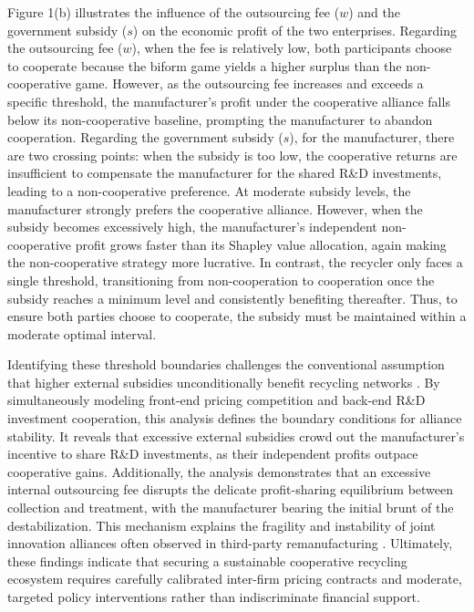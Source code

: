 \documentclass[authoryear,preprint,review,times,10pt]{elsarticle}
\begin{document}
Figure 1(b) illustrates the influence of the outsourcing fee ($w$) and the government subsidy ($s$) on the economic profit of the two enterprises. Regarding the outsourcing fee ($w$), when the fee is relatively low, both participants choose to cooperate because the biform game yields a higher surplus than the non-cooperative game. However, as the outsourcing fee increases and exceeds a specific threshold, the manufacturer's profit under the cooperative alliance falls below its non-cooperative baseline, prompting the manufacturer to abandon cooperation. Regarding the government subsidy ($s$), for the manufacturer, there are two crossing points: when the subsidy is too low, the cooperative returns are insufficient to compensate the manufacturer for the shared R\&D investments, leading to a non-cooperative preference. At moderate subsidy levels, the manufacturer strongly prefers the cooperative alliance. However, when the subsidy becomes excessively high, the manufacturer's independent non-cooperative profit grows faster than its Shapley value allocation, again making the non-cooperative strategy more lucrative. In contrast, the recycler only faces a single threshold, transitioning from non-cooperation to cooperation once the subsidy reaches a minimum level and consistently benefiting thereafter. Thus, to ensure both parties choose to cooperate, the subsidy must be maintained within a moderate optimal interval.

Identifying these threshold boundaries challenges the conventional assumption that higher external subsidies unconditionally benefit recycling networks \citep{yuan2023Differentiated}. By simultaneously modeling front-end pricing competition and back-end R\&D investment cooperation, this analysis defines the boundary conditions for alliance stability. It reveals that excessive external subsidies crowd out the manufacturer's incentive to share R\&D investments, as their independent profits outpace cooperative gains. Additionally, the analysis demonstrates that an excessive internal outsourcing fee disrupts the delicate profit-sharing equilibrium between collection and treatment, with the manufacturer bearing the initial brunt of the destabilization. This mechanism explains the fragility and instability of joint innovation alliances often observed in third-party remanufacturing \citep{chen2025Exploring}. Ultimately, these findings indicate that securing a sustainable cooperative recycling ecosystem requires carefully calibrated inter-firm pricing contracts and moderate, targeted policy interventions rather than indiscriminate financial support.
\end{document}

